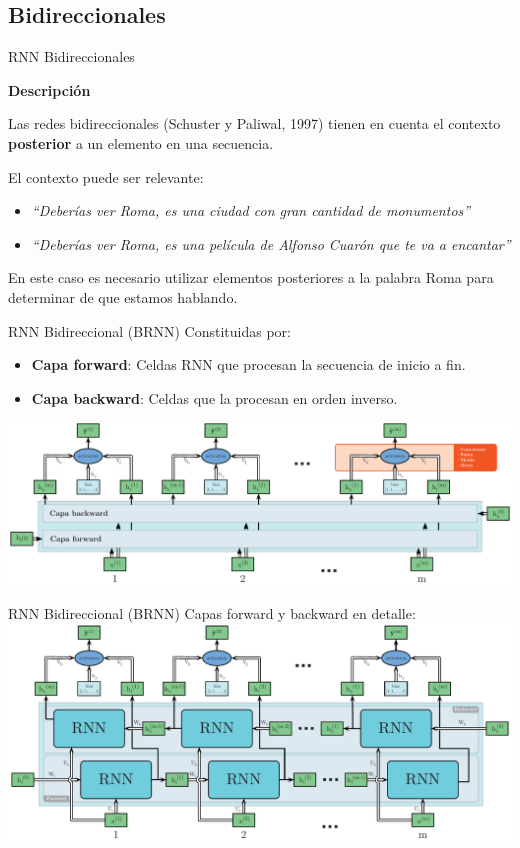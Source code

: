 \documentclass[aspectratio=169]{beamer}
\newenvironment{blockm}[1]{%
  \begin{block}{\textbf{#1}}%
  }{%
  \end{block}%
  \vspace{1em}%
}
\begin{document}
\subsection{Bidireccionales}

\begin{frame}{RNN Bidireccionales}

	\begin{blockm}{Descripción}
		Las redes bidireccionales (Schuster y Paliwal, 1997) tienen en cuenta el contexto \textbf{posterior} a un elemento en una secuencia.
	\end{blockm}
	
	El contexto puede ser relevante:
	\begin{itemize}
		\item \textit{``Deberías ver {\color{blue}Roma}, {\color{teal}es una ciudad} con gran cantidad de monumentos''}
		\item \textit{``Deberías ver {\color{red}Roma}, {\color{teal}es una película} de Alfonso Cuarón que te va a encantar''}
	\end{itemize}
	En este caso es necesario utilizar elementos posteriores a la palabra Roma para determinar de que estamos hablando.

\end{frame}

\begin{frame}{RNN Bidireccional (BRNN)}
	Constituidas por:
	\begin{itemize}
		\item \textbf{Capa forward}: Celdas RNN que procesan la secuencia de inicio a fin.
		\item \textbf{Capa backward}: Celdas que la procesan en orden inverso.
	\end{itemize}
	\vspace{1em}
	\includegraphics[width=\textwidth, center]{imgs/tema4/rnn/RNNBidi mini.pdf}
\end{frame}

\begin{frame}{RNN Bidireccional (BRNN)}
	Capas forward y backward en detalle:\\
	\vspace{1em}
	\includegraphics[width=.9\textwidth, center]{imgs/tema4/rnn/RNNBidi.pdf}
\end{frame}
\end{document}
